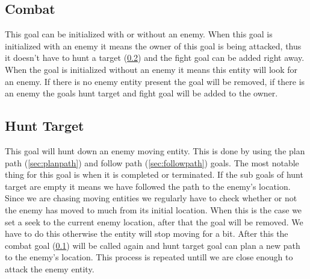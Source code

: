 \subsection{Combat}
\label{sec:combat}
This goal can be initialized with or without an enemy. When this goal is initialized with an enemy it means the owner of this goal is being attacked, thus it doesn’t have to hunt a target (\cref{sec:hunttarget}) and the fight goal can be added right away. When the goal is initialized without an enemy it means this entity will look for an enemy. If there is no enemy entity present the goal will be removed, if there is an enemy the goals hunt target and fight goal will be added to the owner.

\subsection{Hunt Target}
\label{sec:hunttarget}
This goal will hunt down an enemy moving entity. This is done by using the plan path (\cref{sec:planpath}) and follow path (\cref{sec:followpath}) goals. The most notable thing for this goal is when it is completed or terminated. If the sub goals of hunt target are empty it means we have followed the path to the enemy’s location. Since we are chasing moving entities we regularly have to check whether or not the enemy has moved to much from its initial location. When this is the case we set a seek to the current enemy location, after that the goal will be removed. We have to do this otherwise the entity will stop moving for a bit. After this the combat goal (\cref{sec:combat}) will be called again and hunt target goal can plan a new path to the enemy’s location. This process is repeated untill we are close enough to attack the enemy entity.
